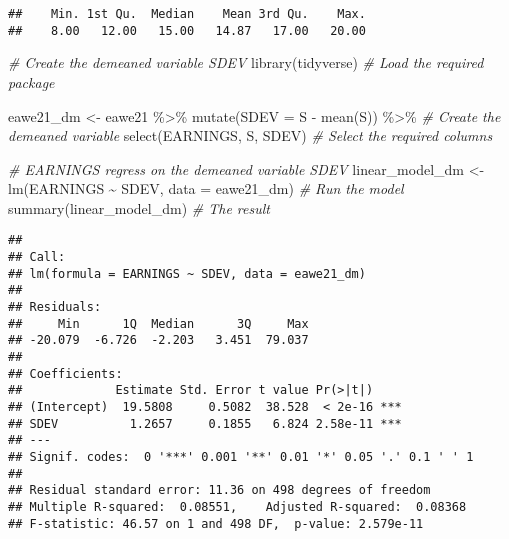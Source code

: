 \documentclass[
]{article}
\newenvironment{Shaded}{\begin{snugshade}}{\end{snugshade}}
\newcommand{\AttributeTok}[1]{\textcolor[rgb]{0.77,0.63,0.00}{#1}}
\newcommand{\CommentTok}[1]{\textcolor[rgb]{0.56,0.35,0.01}{\textit{#1}}}
\newcommand{\FunctionTok}[1]{\textcolor[rgb]{0.00,0.00,0.00}{#1}}
\newcommand{\NormalTok}[1]{#1}
\newcommand{\OtherTok}[1]{\textcolor[rgb]{0.56,0.35,0.01}{#1}}
\newcommand{\SpecialCharTok}[1]{\textcolor[rgb]{0.00,0.00,0.00}{#1}}
\begin{document}
\begin{Shaded}
\end{Shaded}

\begin{verbatim}
##    Min. 1st Qu.  Median    Mean 3rd Qu.    Max. 
##    8.00   12.00   15.00   14.87   17.00   20.00
\end{verbatim}

\begin{Shaded}
\begin{Highlighting}[]
\CommentTok{\# Create the demeaned variable SDEV}
\FunctionTok{library}\NormalTok{(tidyverse)                  }\CommentTok{\# Load the required package}

\NormalTok{eawe21\_dm }\OtherTok{\textless{}{-}}\NormalTok{ eawe21 }\SpecialCharTok{\%\textgreater{}\%}
  \FunctionTok{mutate}\NormalTok{(}\AttributeTok{SDEV =}\NormalTok{ S }\SpecialCharTok{{-}} \FunctionTok{mean}\NormalTok{(S)) }\SpecialCharTok{\%\textgreater{}\%}    \CommentTok{\# Create the demeaned variable}
  \FunctionTok{select}\NormalTok{(EARNINGS, S, SDEV)         }\CommentTok{\# Select the required columns}

\CommentTok{\# EARNINGS regress on the demeaned variable SDEV}
\NormalTok{linear\_model\_dm }\OtherTok{\textless{}{-}} \FunctionTok{lm}\NormalTok{(EARNINGS }\SpecialCharTok{\textasciitilde{}}\NormalTok{ SDEV, }\AttributeTok{data =}\NormalTok{ eawe21\_dm)     }\CommentTok{\# Run the model}
\FunctionTok{summary}\NormalTok{(linear\_model\_dm)                                     }\CommentTok{\# The result      }
\end{Highlighting}
\end{Shaded}

\begin{verbatim}
## 
## Call:
## lm(formula = EARNINGS ~ SDEV, data = eawe21_dm)
## 
## Residuals:
##     Min      1Q  Median      3Q     Max 
## -20.079  -6.726  -2.203   3.451  79.037 
## 
## Coefficients:
##             Estimate Std. Error t value Pr(>|t|)    
## (Intercept)  19.5808     0.5082  38.528  < 2e-16 ***
## SDEV          1.2657     0.1855   6.824 2.58e-11 ***
## ---
## Signif. codes:  0 '***' 0.001 '**' 0.01 '*' 0.05 '.' 0.1 ' ' 1
## 
## Residual standard error: 11.36 on 498 degrees of freedom
## Multiple R-squared:  0.08551,    Adjusted R-squared:  0.08368 
## F-statistic: 46.57 on 1 and 498 DF,  p-value: 2.579e-11
\end{verbatim}
\end{document}
